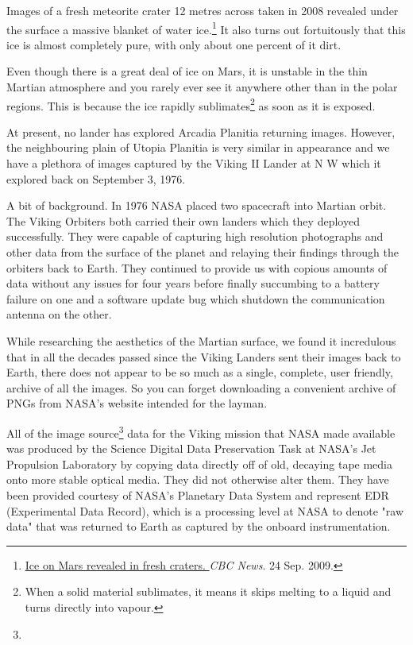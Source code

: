 Images of a fresh meteorite crater 12 metres across taken in 2008 revealed under the surface a massive blanket of water ice.\footnote{\href{http://www.cbc.ca/news/technology/story/2009/09/24/tech-space-water-mars-crater.html}{Ice on Mars revealed in fresh craters. }{\it CBC News}. 24 Sep. 2009.} It also turns out fortuitously that this ice is almost completely pure, with only about one percent of it dirt.

Even though there is a great deal of ice on Mars, it is unstable in the thin Martian atmosphere and you rarely ever see it anywhere other than in the polar regions. This is because the ice rapidly sublimates\footnote{When a solid material sublimates, it means it skips melting to a liquid and turns directly into vapour.} as soon as it is exposed.


At present, no lander has explored Arcadia Planitia returning images. However, the neighbouring plain of Utopia Planitia is very similar in appearance and we have a plethora of images captured by the Viking II Lander at N W which it explored back on September 3, 1976.

A bit of background. In 1976 NASA placed two spacecraft into Martian orbit. The Viking Orbiters both carried their own landers which they deployed successfully. They were capable of capturing high resolution photographs and other data from the surface of the planet and relaying their findings through the orbiters back to Earth. They continued to provide us with copious amounts of data without any issues for four years before finally succumbing to a battery failure on one and a software update bug which shutdown the communication antenna on the other.


While researching the aesthetics of the Martian surface, we found it incredulous that in all the decades passed since the Viking Landers sent their images back to Earth, there does not appear to be so much as a single, complete, user friendly, archive of all the images. So you can forget downloading a convenient archive of PNGs from NASA's website intended for the layman.

All of the image source\footnote{} data for the Viking mission that NASA made available was produced by the Science Digital Data Preservation Task at NASA's Jet Propulsion Laboratory by copying data directly off of old, decaying tape media onto more stable optical media. They did not otherwise alter them. They have been provided courtesy of NASA's Planetary Data System and represent EDR (Experimental Data Record), which is a processing level at NASA to denote "raw data" that was returned to Earth as captured by the onboard instrumentation.

